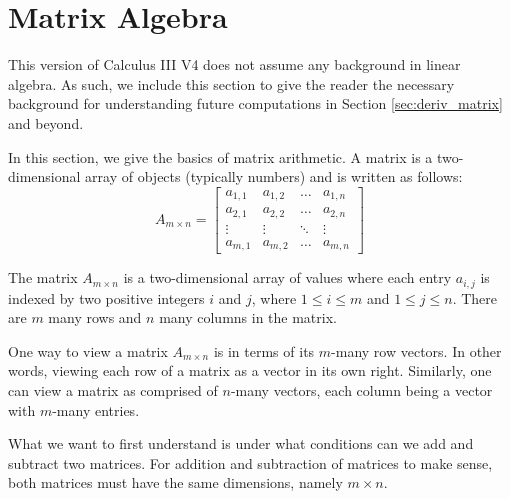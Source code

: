 \section{Matrix Algebra}\label{sec:matrix_algebra}

This version of \apex{} Calculus III V4 does not assume any background in linear algebra.  As such, we include this section to give the reader the necessary background for understanding future computations in Section \ref{sec:deriv_matrix} and beyond.

\bigskip

In this section, we give the basics of matrix arithmetic.  A matrix is a two-dimensional array of objects (typically numbers) and is written as follows:
\[
A_{m \times n} = 
\begin{bmatrix}
a_{1,1} & a_{1,2} & \dots & a_{1,n}\\
a_{2,1} & a_{2,2} &\dots & a_{2,n}\\
\vdots & \vdots &\ddots&  \vdots \\
a_{m,1} & a_{m,2}  & \dots  & a_{m,n}
\end{bmatrix}
\]


The matrix $A_{m\times n}$ is a two-dimensional array of values where each entry $a_{i,j}$ is indexed by two positive integers $i$ and $j$, where $1\leq i\leq m$ and $1\leq j \leq n$.  There are $m$ many rows and $n$ many columns in the matrix.  

One way to view a matrix $A_{m\times n}$ is in terms of its $m$-many row vectors.  In other words, viewing each row of a matrix as a vector in its own right.  Similarly, one can view a matrix as comprised of $n$-many vectors, each column being a vector with $m$-many entries. 
\bigskip

What we want to first understand is under what conditions can we add and subtract two matrices.  For addition and subtraction of matrices to make sense, both matrices must have the same dimensions, namely $m\times n$. \\ 

